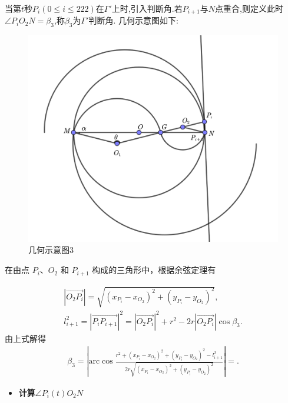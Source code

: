 \documentclass[../main.tex]{subfiles}
\begin{document}
\par 当第$t$秒$P_i(0\leq i\leq 222)$在$\varGamma'$上时,引入判断角.若$P_{i+1}$与$N$点重合,则定义此时$\angle P_iO_2N=\beta_3$,称$\beta_3$为$\varGamma'$判断角. 几何示意图如下:
\begin{figure}[H]
\centering
\includegraphics[width=.6\textwidth]{2}
\caption{几何示意图3}
\end{figure}
\par 在由点 \(P_{i}\)、\(O_{2}\) 和 \(P_{i + 1}\) 构成的三角形中，根据余弦定理有

\begin{gather}\label{1.........454}
\left| \overrightarrow{O_2P_i} \right|=\sqrt{\left( x_{P_i}-x_{O_2} \right) ^2+\left( y_{P_i}-y_{O_2} \right) ^2},
\\
l_{i+1}^{2}=\left| \overrightarrow{P_iP_{i+1}} \right|^2=\left| \overrightarrow{O_2P_i} \right|^2+r^2-2r\left| \overrightarrow{O_2P_i} \right|\cos \beta _3.
\end{gather}
由上式解得
\begin{align}\label{1.........455}
\beta _3=\left| \mathrm{arc}\cos \frac{r^2+\left( x_{P_i}-x_{O_2} \right) ^2+\left( y_{P_i}-y_{O_2} \right) ^2-l_{i+1}^{2}}{2r\sqrt{\left( x_{P_i}-x_{O_2} \right) ^2+\left( y_{P_i}-y_{O_2} \right) ^2}} \right|=.
\end{align}

\begin{itemize}
\item \textbf{计算$\angle P_{i}(t)O_2N$}
\end{itemize}
\end{document}
